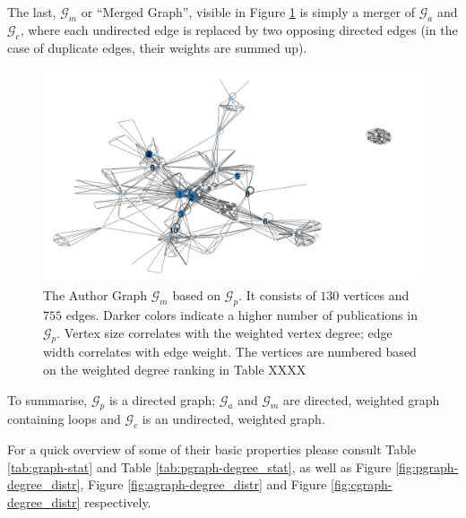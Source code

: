 \documentclass[11pt,a4paper]{book}
\theoremstyle{definition}
\theoremstyle{definition}
\theoremstyle{definition}
\theoremstyle{remark}
\newcommand{\pgraph}{\mathcal{G}_{p}}
\newcommand{\agraph}{\mathcal{G}_{a}}
\newcommand{\cgraph}{\mathcal{G}_{c}}
\newcommand{\acgraph}{\mathcal{G}_{m}}
\begin{document}
The last, $\acgraph$ or ``Merged Graph'', visible in Figure \ref{fig:acgraph-actual_graph} is simply a merger of $\agraph$ and $\cgraph$, where each undirected edge is replaced by two opposing directed edges (in the case of duplicate edges, their weights are summed up).


\begin{figure}[h!]
\includegraphics[width=\textwidth]{mauthor_graph.png}
\caption{The Author Graph  $\acgraph$ based on $\pgraph$. It consists of  $130$ vertices and $755$ edges. 
Darker colors indicate a higher number of publications in $\pgraph$. Vertex size correlates with the weighted vertex degree; 
edge width correlates with edge weight. The vertices are numbered based on the weighted degree ranking in Table XXXX}
\label{fig:acgraph-actual_graph}
\end{figure}

To summarise, $\pgraph$ is a directed graph; $\agraph$ and $\acgraph$ are directed, weighted graph containing loops and $\cgraph$ is an undirected, weighted graph. 



For a quick overview of some of their basic properties please consult Table \ref{tab:graph-stat} and Table  \ref{tab:pgraph-degree_stat}, as well as Figure \ref{fig:pgraph-degree_distr},  Figure \ref{fig:agraph-degree_distr} and  Figure \ref{fig:cgraph-degree_distr} respectively.
\end{document}
